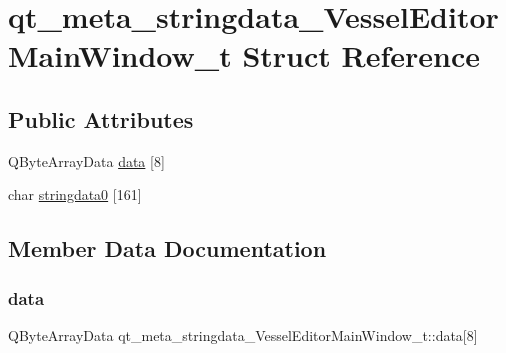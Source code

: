 \hypertarget{structqt__meta__stringdata___vessel_editor_main_window__t}{}\section{qt\+\_\+meta\+\_\+stringdata\+\_\+\+Vessel\+Editor\+Main\+Window\+\_\+t Struct Reference}
\label{structqt__meta__stringdata___vessel_editor_main_window__t}
\subsection*{Public Attributes}
\begin{DoxyCompactItemize}
\item 
Q\+Byte\+Array\+Data \mbox{\hyperlink{structqt__meta__stringdata___vessel_editor_main_window__t_ae699f976c35b967771b7ec2b9323e5ef}{data}} \mbox{[}8\mbox{]}
\item 
char \mbox{\hyperlink{structqt__meta__stringdata___vessel_editor_main_window__t_a7984b67804da70b38a47b48e879ae5cd}{stringdata0}} \mbox{[}161\mbox{]}
\end{DoxyCompactItemize}


\subsection{Member Data Documentation}
\mbox{\label{structqt__meta__stringdata___vessel_editor_main_window__t_ae699f976c35b967771b7ec2b9323e5ef}} 
\subsubsection{\texorpdfstring{data}{data}}
{\footnotesize\ttfamily Q\+Byte\+Array\+Data qt\+\_\+meta\+\_\+stringdata\+\_\+\+Vessel\+Editor\+Main\+Window\+\_\+t\+::data\mbox{[}8\mbox{]}}

\mbox{\label{structqt__meta__stringdata___vessel_editor_main_window__t_a7984b67804da70b38a47b48e879ae5cd}} 
